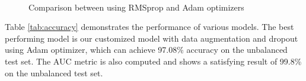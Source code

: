 \documentclass[journal, 12pt, onecolumn,draftclsnofoot]{IEEEtran}
\begin{document}
\begin{figure}[h]{\centering
{}
\\
\caption{\small{Comparison between using RMSprop and Adam optimizers}}
\label{fig:Adam_vs_RMSprop}
}
\end{figure}

Table \ref{tab:accuracy} demonstrates the performance of various models. The best performing model is our customized model with data augmentation and dropout using Adam optimizer, which can achieve 97.08\% accuracy on the unbalanced test set. The AUC metric is also computed and shows a satisfying result of 99.8\% on the unbalanced test set. 
\end{document}
